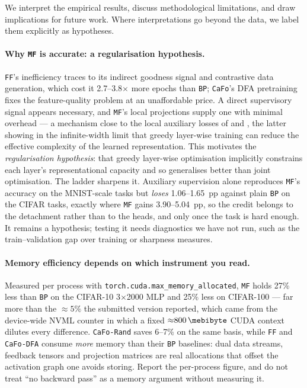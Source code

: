 \documentclass{llncs}
\newcommand{\FF}{\texttt{FF}}
\newcommand{\MF}{\texttt{MF}}
\newcommand{\BP}{\texttt{BP}}
\newcommand{\CaFo}{\texttt{CaFo}}
\newcommand{\CaFoRand}{\texttt{CaFo-Rand}}
\newcommand{\CaFoDFA}{\texttt{CaFo-DFA}}
\begin{document}
We interpret the empirical results, discuss methodological limitations,
and draw implications for future work. Where interpretations go beyond
the data, we label them explicitly as hypotheses.

\paragraph{Why \MF{} is accurate: a regularisation hypothesis.}
\label{sec:discussion_why_mf}
\FF{}'s inefficiency traces to its indirect goodness signal and contrastive
data generation, which cost it \numrange{2.7}{3.8}$\times$ more epochs than
\BP{}; \CaFo{}'s DFA pretraining fixes the feature-quality problem at an
unaffordable price. A direct supervisory signal appears necessary, and \MF{}'s
local projections supply one with minimal overhead --- a mechanism close to
the local auxiliary losses of \cite{ren2023scaling} and
\cite{ishikawa2025local}, the latter showing in the infinite-width limit that
greedy layer-wise training can reduce the effective complexity of the learned
representation. This motivates the \emph{regularisation hypothesis}: that
greedy layer-wise optimisation implicitly constrains each layer's
representational capacity and so generalises better than joint optimisation.
The ladder sharpens it. Auxiliary supervision alone reproduces \MF{}'s
accuracy on the MNIST-scale tasks but \emph{loses} \numrange{1.06}{1.65}~pp
against plain \BP{} on the CIFAR tasks, exactly where \MF{} gains
\numrange{3.90}{5.04}~pp, so the credit belongs to the detachment rather than
to the heads, and only once the task is hard enough. It remains a hypothesis;
testing it needs diagnostics we have not run, such as the train--validation
gap over training or sharpness measures.

\paragraph{Memory efficiency depends on which instrument you read.}
\label{sec:discussion_memory}
Measured per process with \texttt{torch.cuda.max\_memory\_allocated}, \MF{}
holds \num{27}\% less than \BP{} on the CIFAR-10 3$\times$2000 MLP and
\num{25}\% less on CIFAR-100 --- far more than the ${\approx}\num{5}\%$ the
submitted version reported, which came from the device-wide NVML counter in
which a fixed ${\approx}\SI{800}{\mebibyte}$ CUDA context dilutes every
difference. \CaFoRand{} saves \numrange{6}{7}\% on the same basis, while
\FF{} and \CaFoDFA{} consume \emph{more} memory than their \BP{} baselines:
dual data streams, feedback tensors and projection matrices are real
allocations that offset the activation graph one avoids storing. Report the
per-process figure, and do not treat ``no backward pass'' as a memory argument
without measuring it.
\end{document}
